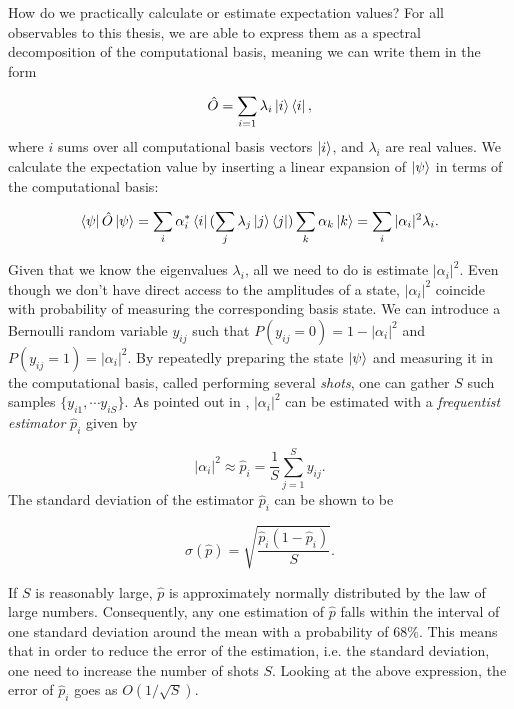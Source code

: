How do we practically calculate or estimate expectation values? For all observables to this thesis, we are able to express them as a spectral decomposition of the computational basis, meaning we can write them in the form 

\begin{equation}\label{eq:ExpectedValue}
    \hat{O} = \sum_{i=1} \lambda_i\ket{i}\bra{i},
\end{equation}
where $i$ sums over all computational basis vectors $\ket{i}$, and $\lambda_i$ are real values. We calculate the expectation value by inserting a linear expansion of $\ket{\psi}$ in terms of the computational basis:

\begin{equation}\label{eq:ExpectedValueExact}
    \bra{\psi}\hat{O}\ket{\psi} = \sum_{i} \alpha_i^*\bra{i}(\sum_{j} \lambda_j\ket{j}\bra{j})\sum_{k} \alpha_k\ket{k} = \sum_{i} |\alpha_i|^2\lambda_i.
\end{equation}

Given that we know the eigenvalues $\lambda_i$, all we need to do is estimate $|\alpha_i|^2$. Even though we don't have direct access to the amplitudes of a state, $|\alpha_i|^2$ coincide with probability of measuring the corresponding basis state. We can introduce a Bernoulli random variable $y_{ij}$ such that $P(y_{ij} = 0) = 1-|\alpha_i|^2$ and $P(y_{ij} = 1) = |\alpha_i|^2$. By repeatedly preparing the state $\ket{\psi}$ and measuring it in the computational basis, called performing several \emph{shots}, one can gather $S$ such samples $\{y_{i1}, \cdots y_{iS}\}$. As pointed out in \citet{SupervisedwquantumComputers}, $|\alpha_i|^2$ can be estimated with a \emph{frequentist estimator} $\hat{p}_i$ given by

\begin{equation}
    |\alpha_i|^2 \approx \hat{p}_i = \frac{1}{S}\sum_{j=1}^S y_{ij}.
\end{equation}
The standard deviation of the estimator $\hat{p}_i$ can be shown to be

\begin{equation}
    \sigma(\hat{p}) = \sqrt{\frac{\hat{p}_i(1-\hat{p}_i)}{S}}.
\end{equation}


If $S$ is reasonably large, $\hat{p}$ is approximately normally distributed by the law of large numbers. Consequently, any one estimation of $\hat{p}$ falls within the interval of one standard deviation around the mean with a probability of $68\%$. This means that in order to reduce the error of the estimation, i.e. the standard deviation, one need to increase the number of shots $S$. Looking at the above expression, the error of $\hat{p}_i$ goes as $O(1/\sqrt{S})$. 

